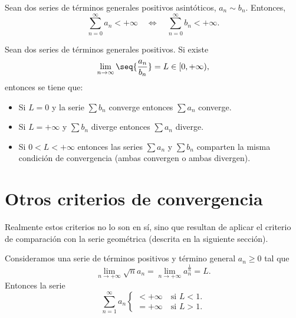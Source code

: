 \begin{prop}
    Sean dos series de términos generales positivos asintóticos, $a_n\sim b_n$. Entonces,
    \begin{equation}
        \sum_{n=0}^\infty a_n < +\infty \quad\Longleftrightarrow \quad \sum_{n=0}^\infty b_n < +\infty.
    \end{equation}
\end{prop}

\begin{prop}
    Sean dos series de términos generales positivos. Si existe
    \begin{equation}
        \lim_{n\to\infty}\seq{\frac{a_n}{b_n}} = L\in[0, +\infty),
    \end{equation}
    entonces se tiene que:
    \begin{itemize}
        \item Si $L = 0$ y la serie $\sum b_n$ converge entonces $\sum a_n$ converge.
        \item Si $L = +\infty$ y $\sum b_n$ diverge entonces $\sum a_n$ diverge.
        \item Si $0 < L < +\infty$ entonces las series $\sum a_n$ y $\sum b_n$ comparten la misma condición de convergencia (ambas convergen o ambas divergen).
    \end{itemize}
\end{prop}

\section{Otros criterios de convergencia}
Realmente estos criterios no lo son en sí, sino que resultan de aplicar el criterio de comparación con la serie geométrica (descrita en la siguiente sección).

\begin{theorem}
    Consideramos una serie de términos positivos y término general $a_n \geq 0$ tal que
    \begin{equation}
        \lim_{n\to+\infty} \sqrt{n}{a_n} = \lim_{n\to+\infty} a^{\frac{1}{n}}_{n} = L.
    \end{equation}
    Entonces la serie
    \begin{equation}
        \sum_{n=1}^\infty a_n \begin{cases}
            < +\infty\quad\textrm{si } L < 1. \\
            = +\infty\quad\textrm{si } L > 1.
        \end{cases}
    \end{equation}
\end{theorem}

